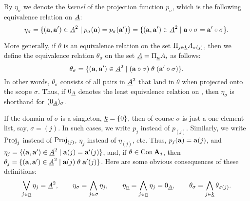 By $\eta_\sigma$ we denote the \emph{kernel} of the projection function $p_\sigma$,
which is the following equivalence relation on $\underline{A}$:
\begin{equation}
  \label{eq:60}
  \eta_\sigma 
  = \{(\ba,\ba') \in \uA^2 \mid p_\sigma(\ba) = p_\sigma(\ba') \}
  = \{(\ba,\ba') \in \uA^2 \mid \ba \circ \sigma = \ba' \circ \sigma \}.
\end{equation}

  More generally, if $\theta$ is an equivalence relation on the set
  $\Pi_{j\in \underline{k}} A_{\sigma(j)}$, then we  define the equivalence relation $\theta_\sigma$ on
  the set $\underline{A} = \Pi_{\underline{n}} A_i$ as follows:
\begin{equation}
  \label{eq:17}
\theta_\sigma = %
\{(\ba, \ba') \in \uA^2 \mid (\ba\circ \sigma) \mathrel{\theta} (\ba' \circ \sigma)\}.
\end{equation}
In other words,  $\theta_\sigma$ consists of all pairs in $\underline{A}^2$ that land in $\theta$
when projected onto the scope $\sigma$. Thus,
if $0_{\underline{A}}$ denotes the least equivalence relation on {\uA},
then $\eta_\sigma$ is shorthand for $(0_{\underline{A}})_\sigma$.


If the domain of $\sigma$ is a singleton, $\underline{k} = \{0\}$, then of course
$\sigma$ is just a one-element list, say, $\sigma= (j)$. 
In such cases, we write $p_j$ instead of $p_{(j)}$. Similarly,
we write $\operatorname{Proj}_j$ instead of $\operatorname{Proj}_{(j)}$, $\eta_j$ instead of $\eta_{(j)}$, etc.  Thus, 
$p_j(\mathbf{a}) = \mathbf{a}(j)$, and $\eta_j = \{(\mathbf{a}, \mathbf{a}') \in \underline{A}^2 \mid \mathbf{a}(j) = \mathbf{a}'(j)\}$,
and, if $\theta\in \operatorname{Con} \mathbf{A}_j$, then
$\theta_j = \{(\mathbf{a}, \mathbf{a}') \in \underline{A}^2 \mid \mathbf{a}(j) \mathrel{\theta} \mathbf{a}'(j)\}$.
Here are some obvious consequences of these definitions:
\[
\bigvee_{j\in \nn}\eta_j =\uA^2, \qquad
 \eta_\sigma= \bigwedge_{j\in \sigma}\eta_j, \qquad %
 \eta_{\nn} = \bigwedge_{j\in \nn}\eta_j = 0_{\uA}, \qquad
\theta_\sigma = \bigwedge_{j\in \kk}\theta_{\sigma(j)}.
\]

